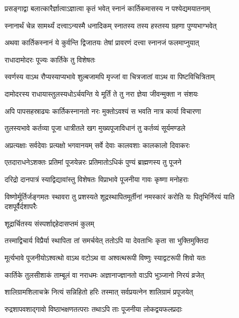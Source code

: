 \twolineshloka
{प्रसङ्गाद्वा बलात्कारैर्ज्ञात्वाऽज्ञात्वा कृतं भवेत्}
{स्नानं कार्तिकमासस्य न पश्येद्यमयातनाम्} %

\twolineshloka
{स्नानार्थं चेन्न सामर्थ्यं दत्त्वाऽन्यस्मै धनादिकम्}
{स्नातस्य तस्य हस्तस्य ग्रहणा पुण्यभाग्भवेत्} %

\twolineshloka
{अथवा कार्तिकस्नानं ये कुर्वन्ति द्विजातयः}
{तेषां प्रावरणं दत्त्वा स्नानजं फलमाप्नुयात्} %


\onelineshloka
{राधादामोदरः पूज्यः कार्तिके तु विशेषतः} %

\twolineshloka
{स्वर्णस्य वाऽथ रौप्यस्याप्यभावे शुल्बजामपि}
{मृज्जां वा चित्रजातां वाऽथ वा पिष्टविचित्रिताम्} %

\twolineshloka
{दामोदरस्य राधायास्तुलस्यधोऽर्चयन्ति ये}
{मूर्तिं ते तु नरा ज्ञेया जीवन्मुक्ता न संशयः} %

\twolineshloka
{अपि पापसहस्राढ्यः कार्तिकस्नानतो नरः}
{मुक्तोऽवश्यं स भवति नात्र कार्या विचारणा} %

\twolineshloka
{तुलस्यभावे कर्तव्या पूजा धात्रीतले खग}
{मुख्यपूजाविधानं तु कर्तव्यं सूर्यमण्डले} %

\twolineshloka
{अप्रत्यक्षाः सर्वदेवाः प्रत्यक्षो भगवानयम्}
{सर्वे देवाः कालवशाः कालकालो दिवाकरः} %

\twolineshloka
{एतदाराधनेऽशक्तः प्रतिमां पूजयेन्नरः}
{प्रतिमातोऽधिकं पुण्यं ब्राह्मणस्य तु पूजने} %

\twolineshloka
{दरिद्रो दानपात्रं स्याद्विद्यावांस्तु विशेषतः}
{विप्राभावे पूजनीया गावः कृष्णा मनोहराः} %

\threelineshloka
{विष्णोर्मूर्तिर्जङ्गमतः स्थावरा तु प्रशस्यते}
{शूद्रस्थापितमूर्तीनां नमस्कारं करोति यः}
{पितृभिर्निरयं याति दशपूर्वैर्दशापरैः} %


\onelineshloka
{शूद्रार्चितस्य संस्पर्शाद्दहेदासप्तमं कुलम्} %

\twolineshloka
{तस्माद्विचार्य विप्रैर्या स्थापिता तां समर्चयेत्}
{ततोऽपि या देवताभिः कृता सा भुक्तिमुक्तिदा} %

\twolineshloka
{मूर्त्यभावे पूजनीयोऽश्वत्थो वाऽथ वटोऽथ वा}
{अश्वत्थरूपी विष्णुः स्याद्वटरूपी शिवो यतः} %

\twolineshloka
{कार्तिके तुलसीशाकं ताम्बूलं वा नराधमः}
{अज्ञानाज्ज्ञानतो वाऽपि भुञ्जानो निरयं व्रजेत्} %

\twolineshloka
{शालिग्रामशिलाचक्रे नित्यं सन्निहितो हरिः}
{तस्मात् सर्वप्रयत्नेन शालिग्रामं प्रपूजयेत्} %

\twolineshloka
{रुद्रशापवशाद्गावो विष्ठाभक्षणतत्पराः}
{तथाऽपि ताः पूजनीया लोकद्वयफलप्रदाः} %

